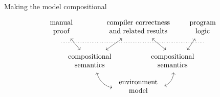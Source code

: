\documentclass[aspectratio=1610,mathserif]{beamer}
\begin{document}
\begin{frame}[fragile]{Making the model compositional}       %
  \[
    \begin{tikzcd}[column sep=-2.5em, row sep=tiny]
      &
      \begin{array}{c} \text{manual} \\ \text{proof} \end{array}
      \ar[ddr, leftrightarrow] &&
      \begin{array}{c}
        \text{compiler correctness} \\
        \text{and related results}
      \end{array}
      \ar[ddl, leftrightarrow]
      \ar[ddr, leftrightarrow] &&
      \begin{array}{c} \text{program} \\ \text{logic} \end{array}
      \ar[ddl, leftrightarrow]
      \\
      {} \ar[rrrrrr, dotted, dash] &&&&&& {}
      \\
      &&
      \begin{array}{c}
        \text{compositional} \\
        \text{semantics}
      \end{array}
      \ar[dr, leftrightarrow, bend right]
      &&
      \hspace{-2em}
      \begin{array}{c}
        \text{compositional} \\
        \text{semantics}
      \end{array}
      \ar[dl, leftrightarrow, bend left]
      \\
      &&&
      \begin{array}{c}
        \text{environment} \\ \text{model}
      \end{array}
    \end{tikzcd}
  \]
\end{frame}
\end{document}

